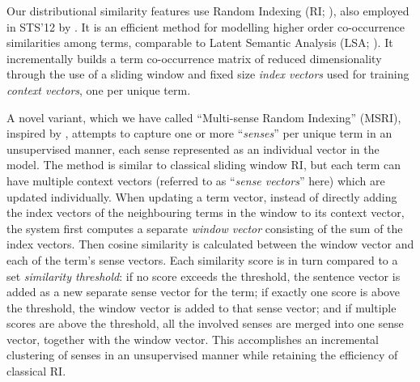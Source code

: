 Our distributional similarity features use Random Indexing (RI; \citealp{Kanerva2000, Sahlgren2005}), also employed in STS'12 by \cite{Tovar2012,Sokolov2012,Semeraro2012}. 
It is an efficient method for modelling higher order co-occurrence similarities among terms, 
comparable to Latent Semantic Analysis (LSA; \citealp{DeerwesterDumaisFurnas:1990}).
It incrementally builds a term co-occurrence matrix of reduced dimensionality through the use of a sliding window and fixed size \emph{index vectors\/} used for training \emph{context vectors\/}, one per unique term.

A novel variant, which we have called ``Multi-sense Random Indexing'' (MSRI), inspired by \citet{Reisinger2010}, attempts to capture one or more ``\emph{senses\/}'' per unique term in an unsupervised manner, each sense represented as an individual vector in the model. 
The method is similar to classical sliding window RI, but each term can have multiple context vectors 
(referred to as ``\emph{sense vectors\/}'' here) which are updated individually.
When updating a term vector, instead of directly adding the index vectors of the neighbouring terms in the window to its context vector, the system first computes a separate \emph{window vector\/} 
consisting of the sum of the index vectors.
Then cosine similarity is calculated between the window vector and each of the term's sense vectors.
Each similarity score is in turn compared to a set \emph{similarity threshold\/}: 
if no score exceeds the threshold, the sentence vector is added as a new separate sense vector for the term;
if exactly one score is above the threshold, the window vector is added to that sense vector;
and if multiple scores are above the threshold, all the involved senses are merged into one sense vector, together with the window vector. 
This accomplishes an incremental clustering of senses in an unsupervised manner 
while retaining the efficiency of classical RI.

